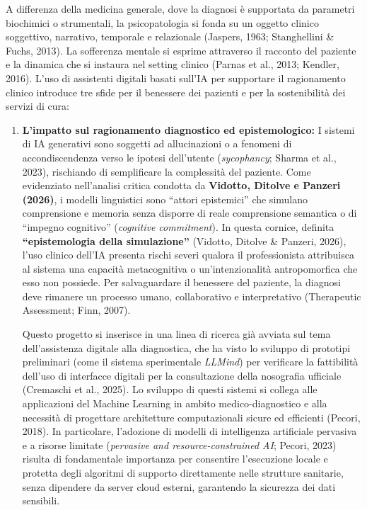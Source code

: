 \documentclass[11pt,a4paper]{article}
\begin{document}
A differenza della medicina generale, dove la diagnosi è supportata da parametri biochimici o strumentali, la psicopatologia si fonda su un oggetto clinico soggettivo, narrativo, temporale e relazionale (Jaspers, 1963; Stanghellini \& Fuchs, 2013). La sofferenza mentale si esprime attraverso il racconto del paziente e la dinamica che si instaura nel setting clinico (Parnas et al., 2013; Kendler, 2016). L'uso di assistenti digitali basati sull'IA per supportare il ragionamento clinico introduce tre sfide per il benessere dei pazienti e per la sostenibilità dei servizi di cura:

\begin{enumerate}[label=\alph*)]
    \item \textbf{L'impatto sul ragionamento diagnostico ed epistemologico:} I sistemi di IA generativi sono soggetti ad allucinazioni o a fenomeni di accondiscendenza verso le ipotesi dell'utente (\textit{sycophancy}; Sharma et al., 2023), rischiando di semplificare la complessità del paziente. Come evidenziato nell'analisi critica condotta da \textbf{Vidotto, Ditolve e Panzeri (2026)}, i modelli linguistici sono ``attori epistemici'' che simulano comprensione e memoria senza disporre di reale comprensione semantica o di ``impegno cognitivo'' (\textit{cognitive commitment}). In questa cornice, definita \textbf{``epistemologia della simulazione''} (Vidotto, Ditolve \& Panzeri, 2026), l'uso clinico dell'IA presenta rischi severi qualora il professionista attribuisca al sistema una capacità metacognitiva o un'intenzionalità antropomorfica che esso non possiede. Per salvaguardare il benessere del paziente, la diagnosi deve rimanere un processo umano, collaborativo e interpretativo (Therapeutic Assessment; Finn, 2007).
    
    Questo progetto si inserisce in una linea di ricerca già avviata sul tema dell'assistenza digitale alla diagnostica, che ha visto lo sviluppo di prototipi preliminari (come il sistema sperimentale \textit{LLMind}) per verificare la fattibilità dell'uso di interfacce digitali per la consultazione della nosografia ufficiale (Cremaschi et al., 2025). Lo sviluppo di questi sistemi si collega alle applicazioni del Machine Learning in ambito medico-diagnostico e alla necessità di progettare architetture computazionali sicure ed efficienti (Pecori, 2018). In particolare, l'adozione di modelli di intelligenza artificiale pervasiva e a risorse limitate (\textit{pervasive and resource-constrained AI}; Pecori, 2023) risulta di fondamentale importanza per consentire l'esecuzione locale e protetta degli algoritmi di supporto direttamente nelle strutture sanitarie, senza dipendere da server cloud esterni, garantendo la sicurezza dei dati sensibili.
    

\end{enumerate}
\end{document}
